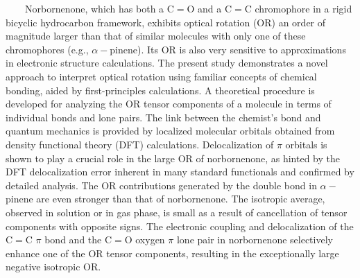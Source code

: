 \documentclass[landscape,a0b,final]{a0poster}
\newcommand{\bindent}{\ \ \ \ }
\newenvironment{poster}{
  \begin{center}
  \begin{minipage}[c]{0.981\textwidth}
}{
  \end{minipage} 
  \end{center}
}
\newcommand{\pbox}[4]{
\psshadowbox[#3]{
\begin{minipage}[t][#2][t]{#1}
#4
\end{minipage}
}}
\begin{document}
\begin{poster}
\begin{multicols}{3}
\begin{center}\pbox{0.8\columnwidth}{}{linewidth=2mm,framearc=0.3,linecolor=ubblue,fillstyle=gradient,gradangle=0,gradbegin=white,gradend=ubgray,gradmidpoint=1.0,framesep=1em}{\begin{center} \Large \color{ubblue}{\bf{Abstract}}\end{center}}\end{center} %
\vspace{0.25cm}
\large \bindent Norbornenone, which has both a C$=$O and a C$=$C chromophore in a rigid bicyclic hydrocarbon framework,
exhibits optical rotation (OR) an order of magnitude larger than that of similar molecules with only one of these chromophores
(e.g., $\alpha-$pinene). Its OR is also very sensitive to approximations in electronic structure calculations. The present study
demonstrates a novel approach to interpret optical rotation using familiar concepts of chemical bonding, aided by first-principles
calculations. A theoretical procedure is developed for analyzing the OR tensor components of a molecule in terms of individual
bonds and lone pairs. The link between the chemist’s bond and quantum mechanics is provided by localized molecular orbitals
obtained from density functional theory (DFT) calculations. Delocalization of $\pi$ orbitals is shown to play a crucial role in the
large OR of norbornenone, as hinted by the DFT delocalization error inherent in many standard functionals and confirmed by
detailed analysis. The OR contributions generated by the double bond in $\alpha-$pinene are even stronger than that of norbornenone.
The isotropic average, observed in solution or in gas phase, is small as a result of cancellation of tensor components with opposite
signs. The electronic coupling and delocalization of the C$=$C $\pi$ bond and the C$=$O oxygen $\pi$ lone pair in norbornenone
selectively enhance one of the OR tensor components, resulting in the exceptionally large negative isotropic OR.

\vspace{0.25cm}
\begin{center}\pbox{0.8\columnwidth}{}{linewidth=2mm,framearc=0.3,linecolor=ubblue,fillstyle=gradient,gradangle=0,gradbegin=white,gradend=ubgray,gradmidpoint=1.0,framesep=1em}{\begin{center} \Large \color{ubblue}{\bf{Functional Tuning}}\end{center}}\end{center}
\vspace{0.25cm}


\end{multicols}
\end{poster}
\end{document}
